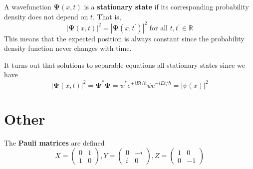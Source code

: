 \documentclass{article}
\begin{document}
  \begin{definition}
    \label{def:stationary-state}
    A wavefunction $\boldsymbol{\Psi}(x, t)$ is a \textbf{stationary state} if its corresponding probability density does not depend on $t$. That is, 
    \begin{equation} 
      |\boldsymbol{\Psi}(x, t)|^2 = |\boldsymbol{\Psi}(x, t^\prime)|^2  \text{ for all } t, t^\prime \in \mathbb{R}
    \end{equation}
    This means that the expected position is always constant since the probability density function never changes with time. 
  \end{definition}

  It turns out that solutions to separable equations all stationary states since we have 
  \begin{equation} 
    |\boldsymbol{\Psi}(x, t)|^2 = \boldsymbol{\Psi}^\ast \boldsymbol{\Psi} = \psi^\ast e^{+i E t/\hbar} \psi e^{- i E t/\hbar} = |\psi (x)|^2
  \end{equation}

\section{Other}

  \begin{definition}
    \label{def:pauli-matrices}
    The \textbf{Pauli matrices} are defined 
      \begin{equation}
        X = \begin{pmatrix} 0 & 1 \\ 1 & 0 \end{pmatrix},
        Y = \begin{pmatrix} 0 & -i \\ i & 0 \end{pmatrix},
        Z = \begin{pmatrix} 1 & 0 \\ 0 & -1 \end{pmatrix}
      \end{equation}
  \end{definition}
\end{document}
